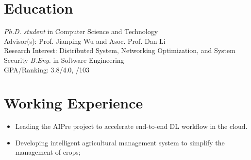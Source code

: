 \documentclass{resume}
\begin{document}



\section{Education}
\textit{Ph.D. student} in Computer Science and Technology\\
Advisor(s): Prof. Jianping Wu and Asoc. Prof. Dan Li\\
Research Interest: Distributed System, Networking Optimization, and System Security
\textit{B.Eng.} in Software Engineering\\
GPA/Ranking: 3.8/4.0,  \nth{1}/103

\section{Working Experience}
\begin{itemize}
	\item Leading the AIPre project to accelerate end-to-end DL workflow in the cloud.
\end{itemize}

\begin{itemize}
	\item Developing intelligent agricultural management system to simplify the management of crops;
\end{itemize}
\end{document}
